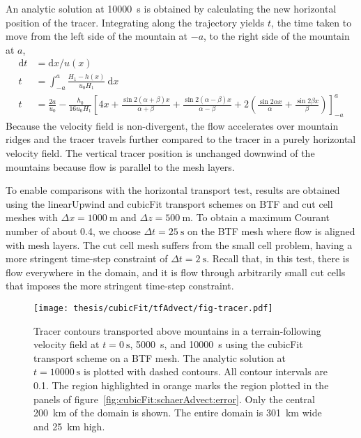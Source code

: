An analytic solution at \SI{10000}{\second} is obtained by calculating the new horizontal position of the tracer.  Integrating along the trajectory yields $t$, the time taken to move from the left side of the mountain at $-a$, to the right side of the mountain at $a$,
\begin{align}
	\mathrm{d}t &= \mathrm{d}x / u(x) \\
	t &= \int_{-a}^a \frac{H_1 - h(x)}{u_0 H_1}\:\mathrm{d}x \\
	t &= \frac{2a}{u_0} - \frac{h_0}{16 u_0 H_1} \left[ 4x + \frac{\sin 2 (\alpha + \beta) x}{\alpha + \beta} +
\frac{\sin 2(\alpha - \beta) x}{\alpha - \beta} + 2 \left( \frac{\sin 2\alpha x}{\alpha} + \frac{\sin 2\beta x}{\beta} \right) \right]_{-a}^a
\end{align}
Because the velocity field is non-divergent, the flow accelerates over mountain ridges and the tracer travels  further compared to the tracer in a purely horizontal velocity field.  The vertical tracer position is unchanged downwind of the mountains because flow is parallel to the mesh layers.

To enable comparisons with the horizontal transport test, results are obtained using the linearUpwind and cubicFit transport schemes on BTF and cut cell meshes with $\Delta x = \SI{1000}{\meter}$ and $\Delta z = \SI{500}{\meter}$.
To obtain a maximum Courant number of about \num{0.4}, we choose $\Delta t = \SI{25}{\second}$ on the BTF mesh where flow is aligned with mesh layers.  The cut cell mesh suffers from the small cell problem, having a more stringent time-step constraint of $\Delta t = \SI{2}{\second}$.  Recall that, in this test, there is flow everywhere in the domain, and it is flow through arbitrarily small cut cells that imposes the more stringent time-step constraint.

\begin{figure}
	\centering
	\texttt{[image: thesis/cubicFit/tfAdvect/fig-tracer.pdf]}
	\caption{Tracer contours transported above mountains in a terrain-following velocity field at $t = \SI{0}{\second}$, \SI{5000}{\second}, and \SI{10000}{\second} using the cubicFit transport scheme on a BTF mesh.
	The analytic solution at $t = \SI{10000}{\second}$ is plotted with dashed contours.
	All contour intervals are \num{0.1}.  
	The region highlighted in orange marks the region plotted in the panels of figure~\ref{fig:cubicFit:schaerAdvect:error}.
	Only the central \SI{200}{\kilo\meter} of the domain is shown.  The entire domain is \SI{301}{\kilo\meter} wide and \SI{25}{\kilo\meter} high.}
	\label{fig:cubicFit:tfAdvect:tracer}
\end{figure}

